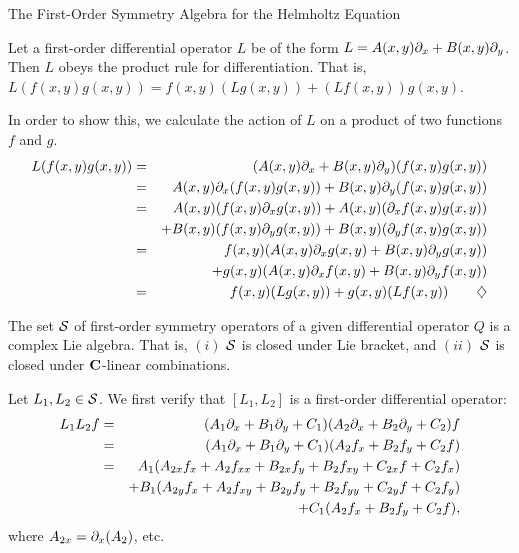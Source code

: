 \begin{section}{The First-Order Symmetry Algebra for the Helmholtz Equation}
\begin{lemma}
\label{prodrule}
Let a first-order differential operator $L$ be of the form $L = A(x,y) \partial_{x} + B(x,y) \partial_{y}$.  Then $L$ obeys the product rule for differentiation.  That is, $L (f(x,y) g(x,y)) = f(x,y) (L g(x,y)) + (L f(x,y)) g(x,y)$.
\end{lemma}

\proof
In order to show this, we calculate the action of $L$ on a product of two functions $f$ and $g$.
\begin{eqnarray*}
L (f(x,y) g(x,y)) & = & (A(x,y) \partial_{x} + B(x,y) \partial_{y}) (f(x,y) g(x,y)) \\
		  & = & A(x,y) \partial_{x} (f(x,y) g(x,y)) + B(x,y) \partial_{y} (f(x,y) g(x,y)) \\
		  & = & A(x,y) (f(x,y) \partial_{x} g(x,y)) + A(x,y) (\partial_{x} f(x,y) g(x,y)) \\
		  &   & + B(x,y) (f(x,y) \partial_{y} g(x,y)) + B(x,y) (\partial_{y} f(x,y) g(x,y)) \\
		  & = & f(x,y)(A(x,y) \partial_{x} g(x,y) + B(x,y) \partial_{y} g(x,y)) \\
		  &   & + g(x,y)(A(x,y) \partial_{x} f(x,y) + B(x,y) \partial_{y} f(x,y)) \\
		  & = & f(x,y) (L g(x,y)) + g(x,y) (L f(x,y)) \qquad \diamondsuit
\end{eqnarray*}

\begin{theorem}
The set $\mathcal{S}$ of first-order symmetry operators of a given differential operator $Q$ is a complex Lie algebra.  That is, $(i)$ $\mathcal{S}$ is closed under Lie bracket, and $(ii)$ $\mathcal{S}$ is closed under $\mathbf{C}$-linear combinations.
\end{theorem}

\proof
Let $L_1, L_2 \in \mathcal{S}$.  We first verify that $[L_1,L_2]$ is a first-order differential operator:
\begin{eqnarray*}
L_1L_2f	& = &	(A_1 \partial_{x} + B_1 \partial_{y} + C_1)(A_2 \partial_{x} + B_2 \partial_{y} + C_2)f \\
	& = &	(A_1 \partial_{x} + B_1 \partial_{y} + C_1)(A_2 f_x + B_2 f_y + C_2f) \\
	& = &   A_1(A_{2x}f_x + A_2f_{xx} + B_{2x}f_y + B_2f_{xy} + C_{2x}f + C_2f_x) \\
	&   &	+ B_1(A_{2y}f_x + A_2f_{xy} + B_{2y}f_y + B_2f_{yy} + C_{2y}f + C_2f_y) \\
	&   &	+ C_1(A_2f_x + B_2f_y + C_2f),
\end{eqnarray*}
where $A_{2x} = \partial_{x} (A_2)$, etc.


\end{section}
